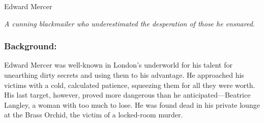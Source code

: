 \begin{NPC}[description=The Murder Victim]{Edward Mercer}
	
    \emph{A cunning blackmailer who underestimated the desperation of those he ensnared.}
    
    \subsubsection*{Background:}
    Edward Mercer was well-known in London’s underworld for his talent for unearthing dirty secrets and using them to his advantage. He approached his victims with a cold, calculated patience, squeezing them for all they were worth. His last target, however, proved more dangerous than he anticipated—Beatrice Langley, a woman with too much to lose. He was found dead in his private lounge at the Brass Orchid, the victim of a locked-room murder.
\end{NPC}
